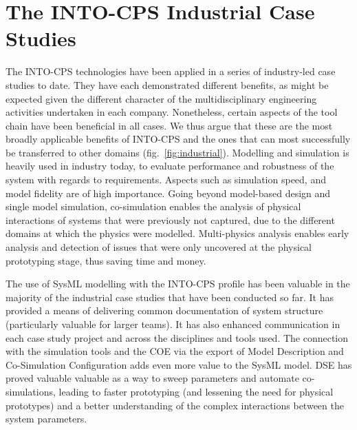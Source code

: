 
\section{The INTO-CPS Industrial Case Studies}\label{sec:casestudies}


The INTO-CPS technologies have been applied in a series of industry-led case studies to date. They have each demonstrated different benefits, as might be expected given the different character of the multidisciplinary engineering activities undertaken in each company. Nonetheless, certain aspects of the tool chain have been beneficial in all cases. We thus argue that these are the most broadly applicable benefits of INTO-CPS and the ones that can most successfully be transferred to other domains (fig.~\ref{fig:industrial}).
Modelling and simulation is heavily used in industry today, to evaluate performance and robustness of the system with regards to requirements. Aspects such as simulation speed, and model fidelity are of high importance. Going beyond model-based design and single model simulation, co-simulation enables the analysis of physical interactions of systems that were previously not captured, due to the different domains at which the physics were modelled. Multi-physics analysis enables early analysis and detection of issues that were only uncovered at the physical prototyping stage, thus saving time and money.

The use of SysML modelling with the INTO-CPS profile has been valuable in the majority of the industrial case studies that have been conducted so far. It has provided a means of delivering common documentation of system structure (particularly valuable for larger teams). It has also enhanced communication in each case study project and across the disciplines and tools used. The connection with the simulation tools and the COE via the export of Model Description and Co-Simulation Configuration adds even more value to the SysML model.
DSE has proved valuable valuable as a way to sweep parameters and automate co-simulations, leading to faster prototyping (and lessening the need for physical prototypes) and a better understanding of the complex interactions between the system parameters. 

